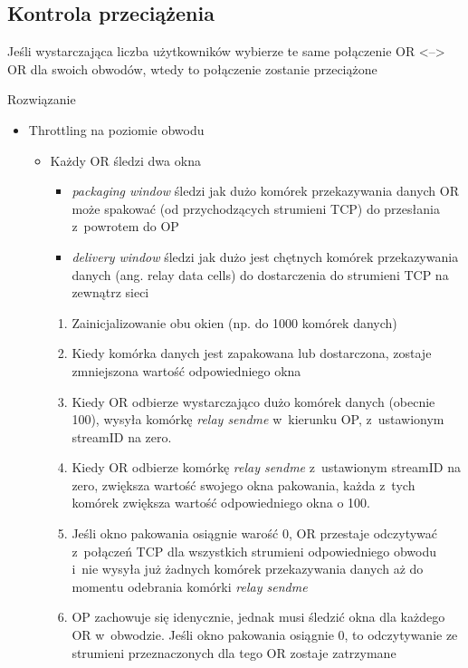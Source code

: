 \subsection{Kontrola przeciążenia}
\begin{description}
  \item Jeśli wystarczająca liczba użytkowników wybierze te same połączenie OR <--> OR dla swoich obwodów, wtedy to połączenie zostanie przeciążone
  \item Rozwiązanie
  \begin{itemize}
    \item Throttling na poziomie obwodu
    \begin{itemize}
      \item Każdy OR śledzi dwa okna
      \begin{itemize}
        \item \textit{packaging window} śledzi jak dużo komórek przekazywania danych OR może spakować (od przychodzących strumieni TCP) do przesłania z~powrotem do OP
        \item \textit{delivery window} śledzi jak dużo jest chętnych komórek przekazywania danych (ang. relay data cells) do dostarczenia do strumieni TCP na zewnątrz sieci
      \end{itemize}
      \begin{enumerate}
        \item Zainicjalizowanie obu okien (np. do 1000 komórek danych)
        \item Kiedy komórka danych jest zapakowana lub dostarczona, zostaje zmniejszona wartość odpowiedniego okna
        \item Kiedy OR odbierze wystarczająco dużo komórek danych (obecnie 100), wysyła komórkę \textit{relay sendme} w~kierunku OP, z~ustawionym streamID na zero.
        \item Kiedy OR odbierze komórkę \textit{relay sendme} z~ustawionym streamID na zero, zwiększa wartość swojego okna pakowania, każda z~tych komórek zwiększa wartość odpowiedniego okna o 100.
        \item Jeśli okno pakowania osiągnie warość 0, OR przestaje odczytywać z~połączeń TCP dla wszystkich strumieni odpowiedniego obwodu i~nie wysyła już żadnych komórek przekazywania danych aż do momentu odebrania komórki \textit{relay sendme}
        \item OP zachowuje się idenycznie, jednak musi śledzić okna dla każdego OR w~obwodzie. Jeśli okno pakowania osiągnie 0, to odczytywanie ze strumieni przeznaczonych dla tego OR zostaje zatrzymane

\end{enumerate}
\end{itemize}
\end{itemize}
\end{description}
